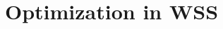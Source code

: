\section{Optimization in WSS}

\begin{comment}

De uma forma mais técnica, diz-se que a otimização é o processo de maximizar ou minimizar a função-objetivo requerida enquanto são satisfeitas determinadas restrições.\cite{rfc21}

Estações de bombeamento de abastecimento de água são um elemento indispensável de qualquer sistema de abastecimento de água. Elas fornecem não apenas o suprimento de água para cada recipiente, mas também a pressão necessária na rede de abastecimento de água para fins de combate a incêndio. O custo da energia é um dos componentes mais importantes do preço da água tratada.\cite{rfc7}

O principal objetivo para otimização é o custo operacional, que compreende o custo da energia elétrica e o custo de manutenção das bombas.\cite{rfc2} Os sistemas de bombeamento consomem a maior quantidade de energia em sistemas de abastecimento de água, geralmente respondendo por mais de 80\% do consumo total de energia.\cite{rfc8}

A otimização do custo de energia em sistemas de abastecimento de água pode ser alcançada por meio de várias medidas, como substituição de bombas, mudança na operação da estação de bombeamento, modernização do sistema de tubulações, modelagem computacional de mudanças na operação da rede e seleção de soluções que garantam os melhores efeitos econômicos e técnicos.\cite{rfc7}

A otimização dos WSS apresenta inúmeras aplicações, mas é crucial enfatizar a importância da otimização do agendamento de bombas devido ao considerável consumo de energia associado a este componente essencial do WSS (Cost efficiency in water supply systems: An applied review on optimization models for the pump scheduling problem)

Os sistemas de bombeamento têm um potencial significativo para melhorias de eficiência energética. Em muitos casos, a otimização das operações consideram a velocidade dixa da bombas e a economia de custos pode ser obtida utilizando o padrão de variação do custo da tarifa de energia elétrica ao longo do dia.\cite{rfc8}

As variações horárias na demanda de água durante o dia são muito maiores em comparação à demanda média diária. Para um consumidor doméstico, a necessidade de água é maior durante as horas da manhã e da noite do que a demanda do meio-dia. Durante os horários de pico, o custo de energia é 2 a 3 vezes mais caro do que durante os horários de consumo mínimo.

Uma solução técnica para essa redução pode ser uma diminuição na potência de bombeamento (mesmo parando bombas se for possível) durante os horários de pico, juntamente com uma entrega extensiva fora desses horários. Consequentemente, os sistemas de distribuição devem ser equipados com tanques de armazenamento.


\end{comment}

